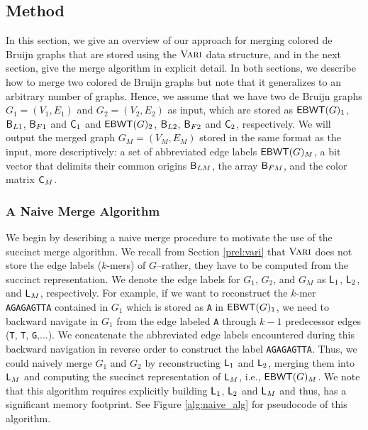 \subsection{Method}

In this section, we give an overview of our approach for merging colored de Bruijn graphs that are stored using the $\mbox{\rm {\sc Vari}}$ data structure, and in the next section, give the merge algorithm in explicit detail.  In both sections, we describe how to merge two colored de Bruijn graphs but note that it generalizes to an  arbitrary number of graphs.  Hence,  we assume that we have two de Bruijn graphs $G_1 = (V_1, E_1)$ and $G_2 = (V_2, E_2)$ as input, which are stored as $\mathsf{EBWT}(G)_1$, $\mathsf{B}_{L1}$, $\mathsf{B}_{F1}$ and $\mbox{\rm {\sf C}}_1$ and $\mathsf{EBWT}(G)_2$, $\mathsf{B}_{L2}$, $\mathsf{B}_{F2}$ and  $\mbox{\rm {\sf C}}_2 $, respectively.  We will output the merged graph $G_M = (V_M, E_M)$ stored in the same format as the input, more descriptively:  a set of abbreviated edge labels $\mathsf{EBWT}(G)_M$, a bit vector that delimits their common origins $\mathsf{B}_{LM}$, the array $\mathsf{B}_{FM}$, and the color matrix $\mbox{\rm {\sf C}}_M$.

\subsubsection{A Naive Merge Algorithm}

We begin by describing a naive merge procedure to motivate the use of the succinct merge algorithm. We recall from Section \ref{prel:vari} that $\mbox{\rm {\sc Vari}}$ does not store the edge labels ($k$-mers) of $G$--rather, they have to be computed from the succinct representation.  We denote the edge labels for $G_1$, $G_2$, and $G_M$ as $\mbox{\rm {\sf L}}_1$, $\mbox{\rm {\sf L}}_2$, and $\mbox{\rm {\sf L}}_M$, respectively.  For example, if we want to reconstruct the $k$-mer {\tt AGAGAGTTA} contained in $G_1$ which is stored as {\tt A} in $\mathsf{EBWT}(G)_1$, we need to backward navigate in $G_1$ from the edge labeled {\tt A} through $k-1$ predecessor edges ({\tt T}, {\tt T}, {\tt G},...). We concatenate the abbreviated edge labels encountered during this backward navigation in reverse order to construct the label {\tt AGAGAGTTA}.  Thus, we could naively merge $G_1$ and $G_2$ by reconstructing  $\mbox{\rm {\sf L}}_{1}$ and $\mbox{\rm {\sf L}}_{2}$, merging them into $\mbox{\rm {\sf L}}_{M}$ and computing the succinct representation of $\mbox{\rm {\sf L}}_{M}$, i.e., $\mathsf{EBWT}(G)_M$.   We note that this algorithm requires explicitly building $\mbox{\rm {\sf L}}_1$, $\mbox{\rm {\sf L}}_2$ and $\mbox{\rm {\sf L}}_M$ and thus, has a significant memory footprint.  See Figure \ref{alg:naive_alg} for pseudocode of this algorithm.

